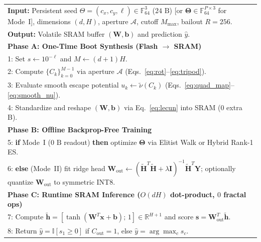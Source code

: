 \begin{algorithm}[t]
\caption{FNS Boot-Time Weight Synthesis and Dual-Mode Inference}
\label{alg:fns}
\footnotesize
\begin{tabular}{@{}p{}@{}}
\textbf{Input:} Persistent seed $\Theta=(c_x,c_y,\ell)\in\mathbb{F}_{64}^3$ ($24\text{ B}$) [or $\boldsymbol{\Theta}\in\mathbb{F}_{64}^{P\times 3}$ for Mode~I], dimensions $(d,H)$, aperture $\mathcal{A}$, cutoff $M_{\max}$, bailout $R=256$. \\
\textbf{Output:} Volatile SRAM buffer $(\mathbf{W},\mathbf{b})$ and prediction $\hat{y}$. \\
\midrule
\textbf{Phase A: One-Time Boot Synthesis (Flash $\to$ SRAM)} \\
1:\; Set $s \leftarrow 10^{-\ell}$ and $M \leftarrow (d+1)H$. \\
2:\; Compute $\{C_k\}_{k=0}^{M-1}$ via aperture $\mathcal{A}$ (Eqs.~\eqref{eq:rot}--\eqref{eq:tripod}). \\
3:\; Evaluate smooth escape potential $u_k \leftarrow \tilde{\nu}(C_k)$ (Eqs.~\eqref{eq:quad_map}--\eqref{eq:smooth_nu}). \\
4:\; Standardize and reshape $(\mathbf{W},\mathbf{b})$ via Eq.~\eqref{eq:lecun} into SRAM ($0$ extra B). \\
\textbf{Phase B: Offline Backprop-Free Training} \\
5:\; \textbf{if} Mode~I ($0\text{ B}$ readout) \textbf{then} optimize $\boldsymbol{\Theta}$ via Elitist Walk or Hybrid Rank-1 ES. \\
6:\; \textbf{else} (Mode~II) fit ridge head $\mathbf{W}_{\mathrm{out}} \leftarrow (\tilde{\mathbf{H}}^T\tilde{\mathbf{H}} + \lambda\mathbf{I})^{-1}\tilde{\mathbf{H}}^T\mathbf{Y}$; optionally quantize $\mathbf{W}_{\mathrm{out}}$ to symmetric INT8. \\
\textbf{Phase C: Runtime SRAM Inference ($O(dH)$ dot-product, $0$ fractal ops)} \\
7:\; Compute $\tilde{\mathbf{h}} = [\tanh(\mathbf{W}^T\mathbf{x} + \mathbf{b});\, 1] \in \mathbb{R}^{H+1}$ and score $\mathbf{s} = \mathbf{W}_{\mathrm{out}}^T \tilde{\mathbf{h}}$. \\
8:\; Return $\hat{y} = \mathbb{I}[s_1 \ge 0]$ if $C_{\mathrm{out}}=1$, else $\hat{y} = \arg\max_c s_c$. \\
\end{tabular}
\end{algorithm}

